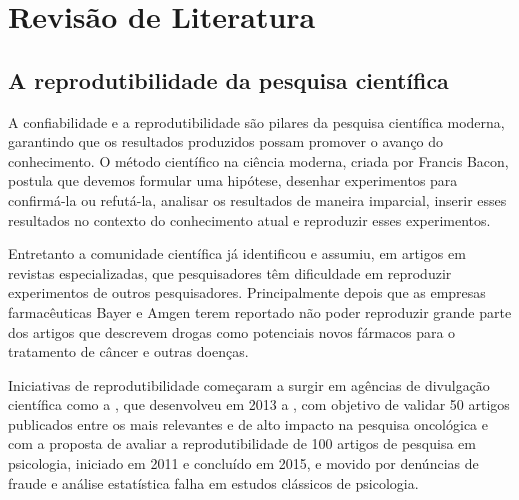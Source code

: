 \chapter{Revisão de Literatura}
\label{ch:fund}


\section{A reprodutibilidade da pesquisa científica}
\label{sec:reprod}

A confiabilidade e a reprodutibilidade são pilares da pesquisa científica moderna, garantindo que os resultados produzidos possam promover o avanço do conhecimento. O método científico na ciência moderna, criada por Francis Bacon, postula que devemos formular uma hipótese, desenhar experimentos para confirmá-la ou refutá-la, analisar os resultados de maneira imparcial, inserir esses resultados no contexto do conhecimento atual e reproduzir esses experimentos.

Entretanto a comunidade científica já identificou e assumiu, em artigos em revistas especializadas, que pesquisadores têm dificuldade em reproduzir experimentos de outros pesquisadores. Principalmente depois que as empresas farmacêuticas Bayer e Amgen terem reportado não poder reproduzir grande parte dos artigos que descrevem drogas como potenciais novos fármacos para o tratamento de câncer e outras doenças.


Iniciativas de reprodutibilidade começaram a surgir em agências de divulgação científica como a , que desenvolveu em 2013 a , com objetivo de validar 50 artigos publicados entre os mais relevantes e de alto impacto na pesquisa oncológica e  com a proposta de avaliar a reprodutibilidade de 100 artigos de pesquisa em psicologia, iniciado em 2011 e concluído em 2015, e movido por denúncias de fraude e análise estatística falha em estudos clássicos de psicologia.


